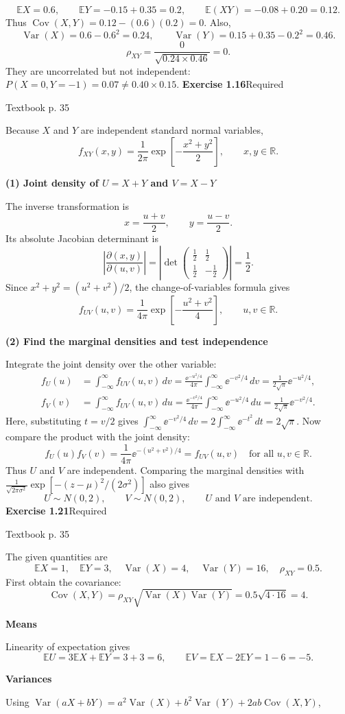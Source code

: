 \documentclass[a4paper,11pt]{article}
\newcommand{\E}{\mathbb E}\newcommand{\Var}{\operatorname{Var}}\newcommand{\Cov}{\operatorname{Cov}}
\newcommand{\problem}[3]{{\LARGE\bfseries Exercise #1}\hfill #2\par{\small\color{gray}Textbook p. #3}\par\vspace{3mm}}
\newcommand{\step}[1]{\par\textbf{#1}\par}
\begin{document}
\[
\E X=0.6,\qquad \E Y=-0.15+0.35=0.2,\qquad
\E(XY)=-0.08+0.20=0.12.
\]
Thus $\Cov(X,Y)=0.12-(0.6)(0.2)=0$. Also,
\[
\Var(X)=0.6-0.6^2=0.24,\qquad
\Var(Y)=0.15+0.35-0.2^2=0.46.
\]
\[
\boxed{\rho_{XY}=\frac{0}{\sqrt{0.24\times0.46}}=0.}
\]
They are uncorrelated but not independent: $P(X=0,Y=-1)=0.07\ne0.40\times0.15$.
\newpage
\problem{1.16}{Required}{35}
Because $X$ and $Y$ are independent standard normal variables,
\[
f_{XY}(x,y)=\frac1{2\pi}\exp\!\left[-\frac{x^2+y^2}{2}\right],
\qquad x,y\in\mathbb R.
\]
\step{(1) Joint density of $U=X+Y$ and $V=X-Y$}
The inverse transformation is
\[
x=\frac{u+v}{2},\qquad y=\frac{u-v}{2}.
\]
Its absolute Jacobian determinant is
\[
\left|\frac{\partial(x,y)}{\partial(u,v)}\right|
=\left|\det\begin{pmatrix}\tfrac12&\tfrac12\\\tfrac12&-\tfrac12\end{pmatrix}\right|
=\frac12.
\]
Since $x^2+y^2=(u^2+v^2)/2$, the change-of-variables formula gives
\[
\boxed{f_{UV}(u,v)=\frac1{4\pi}\exp\!\left[-\frac{u^2+v^2}{4}\right],
\qquad u,v\in\mathbb R.}
\]
\step{(2) Find the marginal densities and test independence}
Integrate the joint density over the other variable:
\begin{align*}
f_U(u)&=\int_{-\infty}^{\infty}f_{UV}(u,v)\,dv
=\frac{\ee^{-u^2/4}}{4\pi}\int_{-\infty}^{\infty}\ee^{-v^2/4}\,dv
=\frac{1}{2\sqrt\pi}\ee^{-u^2/4},\\
f_V(v)&=\int_{-\infty}^{\infty}f_{UV}(u,v)\,du
=\frac{\ee^{-v^2/4}}{4\pi}\int_{-\infty}^{\infty}\ee^{-u^2/4}\,du
=\frac{1}{2\sqrt\pi}\ee^{-v^2/4}.
\end{align*}
Here, substituting $t=v/2$ gives
$\int_{-\infty}^{\infty}\ee^{-v^2/4}\,dv
=2\int_{-\infty}^{\infty}\ee^{-t^2}\,dt=2\sqrt\pi$.
Now compare the product with the joint density:
\[
f_U(u)f_V(v)=\frac{1}{4\pi}\ee^{-(u^2+v^2)/4}=f_{UV}(u,v)
\quad\text{for all }u,v\in\mathbb R.
\]
Thus $U$ and $V$ are independent. Comparing the marginal densities with
$\frac1{\sqrt{2\pi\sigma^2}}\exp[-(z-\mu)^2/(2\sigma^2)]$ also gives
\[
\boxed{U\sim N(0,2),\qquad V\sim N(0,2),\qquad U\text{ and }V\text{ are independent}.}
\]
\newpage
\problem{1.21}{Required}{35}
The given quantities are
\[
\E X=1,\quad\E Y=3,\quad\Var(X)=4,\quad\Var(Y)=16,\quad\rho_{XY}=0.5.
\]
First obtain the covariance:
\[
\Cov(X,Y)=\rho_{XY}\sqrt{\Var(X)\Var(Y)}
=0.5\sqrt{4\cdot16}=4.
\]
\step{Means}
Linearity of expectation gives
\[
\boxed{\E U=3\E X+\E Y=3+3=6,}
\qquad
\boxed{\E V=\E X-2\E Y=1-6=-5.}
\]
\step{Variances}
Using $\Var(aX+bY)=a^2\Var(X)+b^2\Var(Y)+2ab\Cov(X,Y)$,
\end{document}
